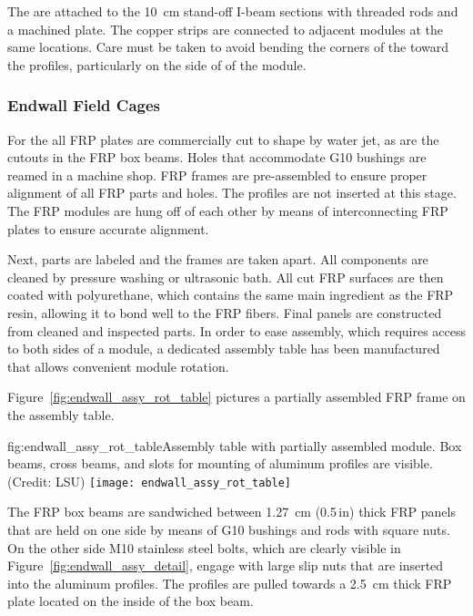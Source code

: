 The  are attached to the \SI{10}{\cm} stand-off I-beam sections with threaded rods and a machined plate. The copper strips are connected to adjacent modules at the same locations. Care must be taken to avoid bending the corners of the  toward the profiles, particularly on the  side of of the module.

\subsubsection{Endwall Field Cages}

For the  all FRP plates are commercially cut to shape by water jet, as are the cutouts in the FRP box beams. %
Holes that accommodate G10 bushings are reamed in a machine shop. FRP frames are pre-assembled to ensure proper alignment of all FRP parts and %
holes. The profiles are not inserted at this stage. The FRP modules are hung off of each other by means of interconnecting FRP plates to ensure accurate alignment.

Next, parts are labeled and the frames are taken apart. All components are cleaned by pressure washing or ultrasonic bath. All cut FRP surfaces are then coated with polyurethane, which contains the same main ingredient as the FRP resin, allowing it to bond well to the FRP fibers. Final panels are constructed from cleaned and inspected parts. In order to ease assembly, which requires access to both sides of a module,
a dedicated assembly table has been manufactured that allows convenient module rotation. 

Figure~\ref{fig:endwall_assy_rot_table} pictures a partially assembled  FRP frame on the assembly table.
\begin{dunefigure}{fig:endwall_assy_rot_table}{Assembly table with partially assembled  module. Box beams, cross beams, and slots for mounting of aluminum profiles are visible. (Credit: LSU)}
 \texttt{[image: endwall\_assy\_rot\_table]}
 \end{dunefigure}
The FRP box beams are sandwiched between \SI{1.27}{\cm} (\num{0.5}\,in) thick FRP panels that are held on one side by means of G10 bushings and rods with square nuts.
On the other side M10 stainless steel bolts, which are clearly visible in Figure~\ref{fig:endwall_assy_detail},  
engage with large slip nuts that are inserted into the aluminum profiles. The profiles 
are pulled towards a \SI{2.5}{\cm} thick FRP plate located 
on the inside of the box beam.
%


